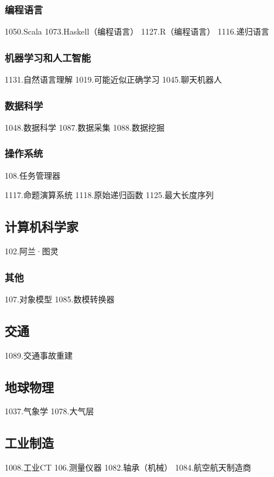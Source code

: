 \subsubsection{编程语言}
1050.Scala
1073.Haskell（编程语言）
1127.R（编程语言）
1116.递归语言

\subsubsection{机器学习和人工智能}
1131.自然语言理解
1019.可能近似正确学习
1045.聊天机器人

\subsubsection{数据科学}
1048.数据科学
1087.数据采集
1088.数据挖掘

\subsubsection{操作系统}
108.任务管理器

1117.命题演算系统
1118.原始递归函数
1125.最大长度序列

\subsection{计算机科学家}
102.阿兰·图灵

\subsubsection{其他}
107.对象模型
1085.数模转换器

\subsection{交通}
1089.交通事故重建

\subsection{地球物理}
1037.气象学
1078.大气层

\subsection{工业制造}
1008.工业CT
106.测量仪器
1082.轴承（机械）
1084.航空航天制造商
